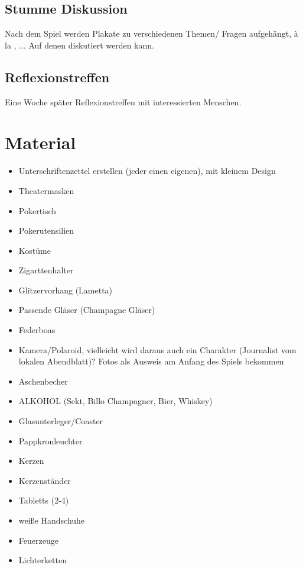 \documentclass[12pt, a4paper, openany]{report}
\begin{document}
\section{Stumme Diskussion}
Nach dem Spiel werden Plakate zu verschiedenen Themen/ Fragen aufgehängt, à la , ... Auf denen  diskutiert werden kann.

\section{Reflexionstreffen}
Eine Woche später Reflexionstreffen mit interessierten Menschen.

\chapter{Material}
\begin{itemize}
    \item Unterschriftenzettel erstellen (jeder einen eigenen), mit kleinem Design
    \item Theatermasken
    \item Pokertisch
    \item Pokerutensilien
    \item Kostüme
    \item Zigarttenhalter
    \item Glitzervorhang (Lametta)
    \item Passende Gläser (Champagne Gläser)
    \item Federboas
    \item Kamera/Polaroid, vielleicht wird daraus auch ein Charakter (Journalist vom lokalen Abendblatt)? Fotos als Ausweis am Anfang des Spiels bekommen
    \item Aschenbecher 
    \item ALKOHOL (Sekt, Billo Champagner, Bier, Whiskey)
    \item Glasunterleger/Coaster
    \item Pappkronleuchter
    \item Kerzen
    \item Kerzenständer
    \item Tabletts (2-4)
    \item weiße Handschuhe
    \item Feuerzeuge
    \item Lichterketten
\end{itemize}

\printbibliography
\listoftodos
\end{document}
